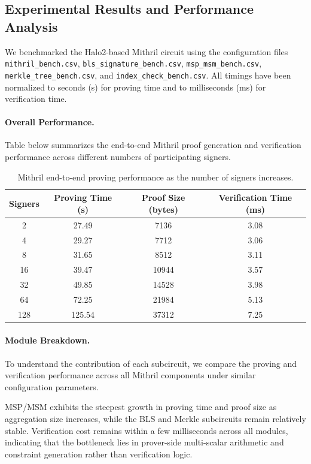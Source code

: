 \documentclass{article}
\begin{document}
\subsection{Experimental Results and Performance Analysis}

We benchmarked the Halo2-based Mithril circuit using the configuration files \texttt{mithril\_bench.csv}, \texttt{bls\_signature\_bench.csv}, \texttt{msp\_msm\_bench.csv}, \texttt{merkle\_tree\_bench.csv}, and \texttt{index\_check\_bench.csv}. All timings have been normalized to seconds (s) for proving time and to milliseconds (ms) for verification time.

\paragraph{Overall Performance.}
Table below summarizes the end-to-end Mithril proof generation and verification performance across different numbers of participating signers.

\begin{table}[h]
\centering
\begin{tabular}{cccc}
\toprule
\textbf{Signers} & \textbf{Proving Time (s)} & \textbf{Proof Size (bytes)} & \textbf{Verification Time (ms)} \\
\midrule
2   & 27.49 & 7136  & 3.08 \\
4   & 29.27 & 7712  & 3.06 \\
8   & 31.65 & 8512  & 3.11 \\
16  & 39.47 & 10944 & 3.57 \\
32  & 49.85 & 14528 & 3.98 \\
64  & 72.25 & 21984 & 5.13 \\
128 & 125.54 & 37312 & 7.25 \\
\bottomrule
\end{tabular}
\caption{Mithril end-to-end proving performance as the number of signers increases.}
\label{tab:mithril-bench}
\end{table}

\paragraph{Module Breakdown.}
To understand the contribution of each subcircuit, we compare the proving and verification performance across all Mithril components under similar configuration parameters.


\noindent
MSP/MSM exhibits the steepest growth in proving time and proof size as aggregation size increases, while the BLS and Merkle subcircuits remain relatively stable. Verification cost remains within a few milliseconds across all modules, indicating that the bottleneck lies in prover-side multi-scalar arithmetic and constraint generation rather than verification logic.
\end{document}

